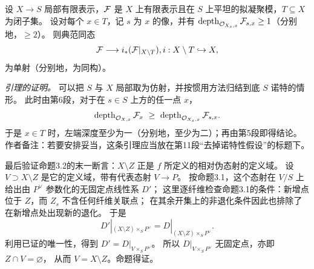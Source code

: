 \def\newscope{V-L-depth}

设 \(X\to S\) 局部有限表示，\(\mathcal F\) 是 \(X\) 上有限表示且在 \(S\) 上平坦的拟凝聚模，\(T\subseteq X\) 为闭子集。
设对每个 \(x\in T\)，记 \(s\) 为 \(x\) 的像，并有
\(\operatorname{depth}_{\mathcal O_{X_s,x}}\mathcal F_{s,x}\geq1\)（分别地，\(\geq2\)）。
则典范同态
\[
 \mathcal F\longrightarrow i_*(\mathcal F|_{X\setminus T}),
 i:X\setminus T\hookrightarrow X,
\]
为单射（分别地，为同构）。

\emph{引理的证明。}
可以把 \(S\) 与 \(X\) 局部取为仿射，并按惯用方法归结到底 \(S\) 诺特的情形。
此时由第6段，对于在 \(s\in S\) 上方的任一点 \(x\)，
\[
 \depth_{\OO_{X,x}}\FF_x\ \geq\ \depth_{\OO_{X_s,x}}\FF_{s,x}.
\]
于是 \(x\in T\) 时，左端深度至少为一（分别地，至少为二）；再由第5段即得结论。
作者备注：若要安排妥当，这条引理应当放在第11段“去掉诺特性假设”的标题下。

最后验证命题3.2的末一断言：\(X\setminus Z\) 正是 \(f\) 所定义的相对伪态射的定义域。
设 \(V\supset X\setminus Z\) 是它的定义域，带有代表态射 \(V\to P\)。
按命题3.1，这个态射在 \(V/S\) 上给出由 \(P^\vee\) 参数化的无固定点线性系 \(D'\)；
这里逐纤维检查命题3.1的条件：新增点位于 \(Z\)，而 \(Z_s\) 不含任何纤维关联点；
在其余开集上的非退化条件因此也排除了在新增点处出现新的退化。
于是
\[
 D'|_{(X\setminus Z)\times_S P^\vee}
 = D|_{(X\setminus Z)\times_S P^\vee}.
\]
利用已证的唯一性，得到 \(D'=D|_{V\times_S P^\vee}\)。
所以 \(D|_{V\times_S P^\vee}\) 无固定点，亦即 \(Z\cap V=\varnothing\)，
从而 \(V=X\setminus Z\)。命题得证。
\par\endgroup
